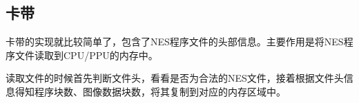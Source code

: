 \documentclass[a4paper]{ltxdoc}
\begin{document}
{%
\subsection{卡带}
卡带的实现就比较简单了，包含了NES程序文件的头部信息。主要作用是将NES程序文件读取到CPU/PPU的内存中。

读取文件的时候首先判断文件头，看看是否为合法的NES文件，接着根据文件头信息得知程序块数、图像数据块数，将其复制到对应的内存区域中。

}
\end{document}
